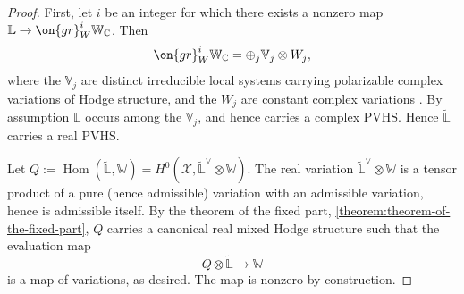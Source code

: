 \documentclass[12 pt]{amsart}
\theoremstyle{plain}
\newtheorem{corollary}[subsubsection]{Corollary}
\theoremstyle{definition}
\theoremstyle{remark}
\numberwithin{equation}{section}
\DeclareMathOperator\Hom{Hom}
\begin{document}
	\begin{proof}
	First, let $i$ be an integer for which there exists a nonzero map $\mathbb{L}\to
	\on{gr}^i_W\mathbb{W}_\mathbb{C}$. Then $$\on{gr}^i_W
	\mathbb{W}_\mathbb{C}=\oplus_j \mathbb{V}_j\otimes W_j,$$ where the
	$\mathbb{V}_j$ are distinct irreducible local systems carrying
	polarizable complex variations of Hodge structure, and the $W_j$ are
	constant complex variations \cite[Proposition 4.1.4(2)]{LL:geometric-local-systems}. By assumption $\mathbb{L}$
	occurs among the $\mathbb{V}_j$, and hence carries a complex PVHS. 
	Hence
	$\widetilde{\mathbb{L}}$ carries a real PVHS.
	
		Let $Q:=\Hom(\widetilde{\mathbb{L}},
		\mathbb{W})=H^0(\mathscr{X}, \widetilde{\mathbb{L}}^\vee\otimes
		\mathbb{W})$. The real variation
		$\widetilde{\mathbb{L}}^\vee\otimes \mathbb{W}$ is a tensor
		product of a pure (hence admissible) variation with an
		admissible variation, hence is admissible itself. By the theorem
		of the fixed part, \autoref{theorem:theorem-of-the-fixed-part}, $Q$ carries a canonical real mixed Hodge structure such that the evaluation map $$Q\otimes \widetilde{\mathbb{L}}\to \mathbb{W}$$ is a map of variations, as desired. The map is nonzero by construction.
	\end{proof}

\end{document}
